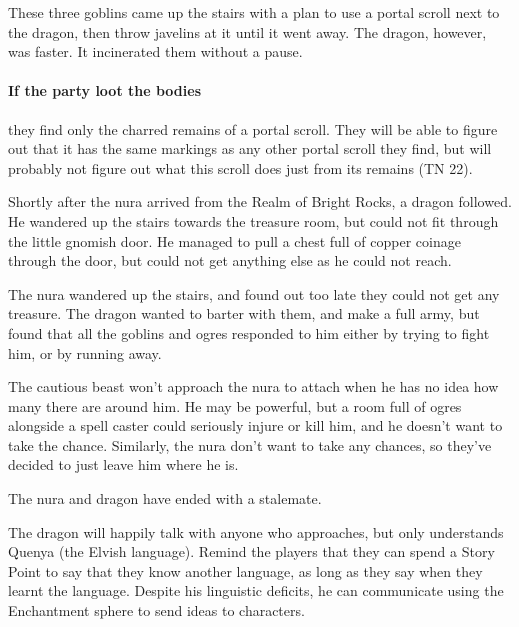 \begin{multicols}{2}
\begin{boxtext}
\end{boxtext}

\begin{exampletext}

	These three goblins came up the stairs with a plan to use a portal scroll next to the dragon, then throw javelins at it until it went away.
	The dragon, however, was faster.
	It incinerated them without a pause.

\end{exampletext}

\paragraph{If the party loot the bodies}
they find only the charred remains of a portal scroll.
They will be able to figure out that it has the same markings as any other portal scroll they find, but will probably not figure out what this scroll does just from its remains (TN 22).


\begin{exampletext}

	Shortly after the nura arrived from the Realm of Bright Rocks, a dragon followed.
	He wandered up the stairs towards the treasure room, but could not fit through the little gnomish door.
	He managed to pull a chest full of copper coinage through the door, but could not get anything else as he could not reach.

	The nura wandered up the stairs, and found out too late they could not get any treasure.
	The dragon wanted to barter with them, and make a full army, but found that all the goblins and ogres responded to him either by trying to fight him, or by running away.

	The cautious beast won't approach the nura to attach when he has no idea how many there are around him.
	He may be powerful, but a room full of ogres alongside a spell caster could seriously injure or kill him, and he doesn't want to take the chance.
	Similarly, the nura don't want to take any chances, so they've decided to just leave him where he is.

	The nura and dragon have ended with a stalemate.

\end{exampletext}

The dragon will happily talk with anyone who approaches, but only understands Quenya (the Elvish language).
Remind the players that they can spend a Story Point to say that they know another language, as long as they say when they learnt the language.
Despite his linguistic deficits, he can communicate using the Enchantment sphere to send ideas to characters.


\end{multicols}
